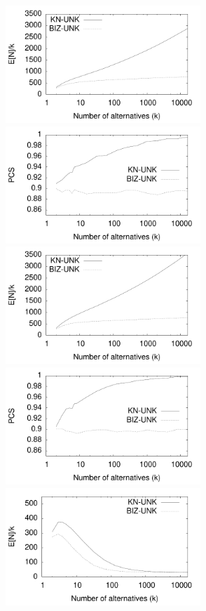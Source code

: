 \documentclass[12pt]{article}
\begin{document}

  \begin{figure}[tb]
    \center
    \includegraphics[width=2.9in]{pdf/FINAL-UNK-SCINCA-Nk} 
    \includegraphics[width=2.9in]{pdf/FINAL-UNK-SCINCA-PCS}
    \includegraphics[width=2.9in]{pdf/FINAL-UNK-SCDECA-Nk} 
    \includegraphics[width=2.9in]{pdf/FINAL-UNK-SCDECA-PCS}
    \includegraphics[width=2.9in]{pdf/FINAL-UNK-MDMINCA-Nk} 

\end{figure}
\end{document}
